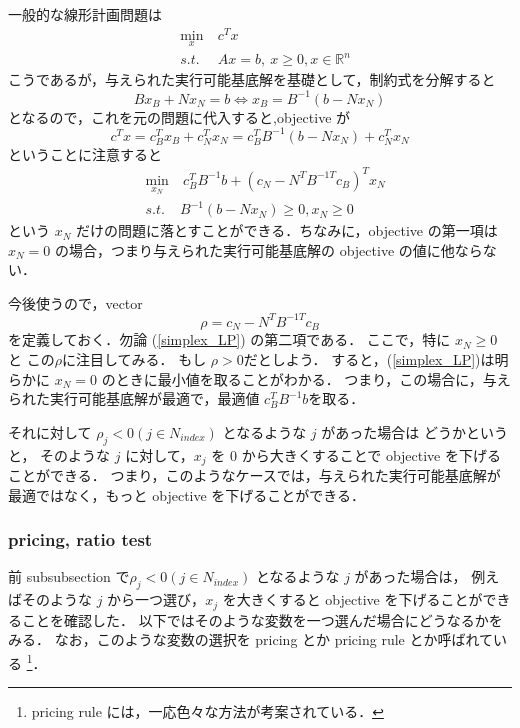 \documentclass[11pt, a4]{article}
\begin{document}
一般的な線形計画問題は
\begin{eqnarray}
  &\min_{x}&\ c^Tx\nonumber\\
  &s.t.&\ Ax = b,\ x\geq 0, x \in \mathbb{R}^n
\end{eqnarray}
こうであるが，与えられた実行可能基底解を基礎として，制約式を分解すると
\begin{equation}
  Bx_B + Nx_N = b \Leftrightarrow x_B = B^{-1}(b - Nx_N)
\end{equation}
となるので，これを元の問題に代入すると,objective が
\begin{equation}
  c^T x = c_B^Tx_B + c_N^T x_N = c_B^TB^{-1}(b - Nx_N) + c_N^Tx_N
\end{equation}
ということに注意すると
\begin{eqnarray}
  &\min_{x_N}&\ c_B^TB^{-1}b + (c_N - N^T B^{-1 T}c_B)^Tx_N\nonumber\\
  &s.t.& B^{-1}(b - Nx_N)\geq 0, x_N\geq 0
  \label{simplex_LP}
\end{eqnarray}
という $x_N$ だけの問題に落とすことができる．ちなみに，objective の第一項は
$x_N = 0$ の場合，つまり与えられた実行可能基底解の objective の値に他ならない．

今後使うので，vector 
\begin{equation}
  \rho = c_N - N^TB^{-1 T}c_B
  \label{def_rho}
\end{equation}
を定義しておく．勿論 (\ref{simplex_LP}) の第二項である．
ここで，特に $x_N \geq 0$ と この$\rho$に注目してみる．
もし $\rho > 0$だとしよう．
すると，(\ref{simplex_LP})は明らかに $x_N = 0$ のときに最小値を取ることがわかる．
つまり，この場合に，与えられた実行可能基底解が最適で，最適値 $c_B^TB^{-1}b$を取る．

それに対して $\rho_j < 0 (j \in N_{index})$ となるような $j$ があった場合は
どうかというと，
そのような $j$ に対して，$x_j$ を $0$ から大きくすることで objective を下げることができる．
つまり，このようなケースでは，与えられた実行可能基底解が最適ではなく，もっと objective を下げることができる．


\subsubsection{pricing, ratio test}
前 subsubsection で$\rho_j < 0 (j \in N_{index})$ となるような $j$ があった場合は，
例えばそのような $j$ から一つ選び，$x_j$ を大きくすると objective を下げることができることを確認した．
以下ではそのような変数を一つ選んだ場合にどうなるかをみる．
なお，このような変数の選択を pricing とか pricing rule とか呼ばれている
\footnote{pricing rule には，一応色々な方法が考案されている．}．
\end{document}
